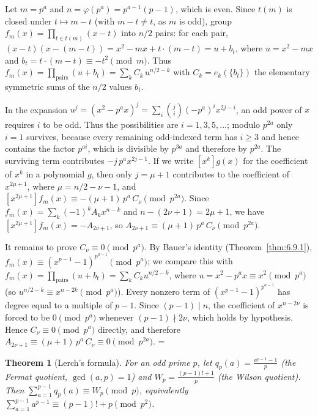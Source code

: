 \documentclass[11pt]{article}
\makeatletter
\let\nt@closedisplay\]
\def\nt@guardedclose{\@ifnextchar\par{\nt@closeafterpar}{\@ifnextchar\end{\postdisplaypenalty\@M\nt@closedisplay}{\nt@closedisplay}}}
\def\nt@closeafterpar\par{\@ifnextchar\par{\nt@closeafterpar}{\@ifnextchar\end{\postdisplaypenalty\@M\nt@closedisplay\par}{\nt@closedisplay\par}}}
\renewenvironment{proof}[1][\proofname]{\par
  \pushQED{\qed}\normalfont\topsep\medskipamount\edef\nt@afterproof{\@endparpenalty=\the\@endparpenalty\relax}\@beginparpenalty\@M\@endparpenalty\@M\let\]\nt@guardedclose\trivlist\item[]\textit{#1\@addpunct{.}} \ignorespaces}{\ifvmode\addpenalty\@M\fi\popQED\nt@afterproof\endtrivlist\@endpefalse}
\theoremstyle{ntstyle}
\newtheorem{theorem}{Theorem}[subsection]
\makeatother
\begin{document}
\begin{proof}
  Let $m = p^{a}$ and $n = \varphi(p^{a}) = p^{a-1}(p-1)$, which is even. Since $t(m)$ is closed under
  $t \mapsto m - t$ (with $m - t \neq t$, as $m$ is odd), group $f_m(x) = \prod_{t \in t(m)}(x-t)$ into $n/2$
  pairs: for each pair, $(x-t)(x-(m-t)) = x^{2} - m x + t\cdot(m-t) = u + b_t$, where $u = x^{2} - m x$ and
  $b_t = t\cdot(m-t) \equiv -t^{2} \pmod{m}$. Thus
  $f_m(x) = \prod_{\text{pairs}}(u + b_t) = \sum_{k} C_k\, u^{n/2 - k}$ with $C_k = e_k(\{b_t\})$ the
  elementary symmetric sums of the $n/2$ values $b_t$.

  In the expansion $u^{j} = (x^{2} - p^{a} x)^{j} = \sum_{i} \binom{j}{i}(-p^{a})^{i} x^{2j - i}$, an odd power of
  $x$ requires $i$ to be odd. Thus the possibilities are $i=1,3,5,\ldots$; modulo $p^{2a}$ only $i=1$ survives,
  because every remaining odd-indexed term has $i\ge3$ and hence contains the factor $p^{ai}$, which is divisible
  by $p^{3a}$ and therefore by $p^{2a}$. The surviving term contributes $-j\,p^{a} x^{2j-1}$. If we write
  $[x^{k}] g(x)$ for the coefficient of $x^{k}$ in a polynomial $g$, then only
  $j = \mu+1$ contributes to the coefficient of $x^{2\mu+1}$, where $\mu = n/2 - \nu - 1$, and
  $[x^{2\mu+1}] f_m(x) \equiv -(\mu+1)\,p^{a}\, C_{\nu} \pmod{p^{2a}}$. Since
  $f_m(x) = \sum_k (-1)^{k} A_k x^{n-k}$ and $n - (2\nu+1) = 2\mu+1$, we have $[x^{2\mu+1}] f_m(x) = -A_{2\nu+1}$,
  so
  $A_{2\nu+1} \equiv (\mu+1)\,p^{a}\, C_{\nu} \pmod{p^{2a}}$.

  It remains to prove $C_{\nu} \equiv 0 \pmod{p^{a}}$. By Bauer's identity
  (Theorem~\ref{thm:6.9.1}), $f_m(x) \equiv (x^{p-1}-1)^{p^{a-1}} \pmod{p^{a}}$;
  we compare this with $f_m(x) = \prod_{\text{pairs}}(u+b_t) = \sum_k C_k u^{n/2-k}$, where
  $u = x^2 - p^a x \equiv x^2 \pmod{p^a}$ (so
  $u^{n/2-k} \equiv x^{n-2k} \pmod{p^a}$). Every nonzero term of
  $(x^{p-1}-1)^{p^{a-1}}$ has degree equal to a multiple of $p-1$. Since
  $(p-1)\mid n$, the coefficient of $x^{n-2\nu}$ is forced to be $0 \pmod{p^a}$ whenever $(p-1) \nmid 2\nu$, which
  holds by hypothesis.
  Hence $C_{\nu} \equiv 0 \pmod{p^{a}}$ directly, and therefore
  $A_{2\nu+1} \equiv (\mu+1)\,p^{a}\,C_{\nu} \equiv 0 \pmod{p^{2a}}$.
\end{proof}

\begin{theorem}[Lerch's formula]\label{thm:6.9.3}\label{thm:lerch-formula}
  For an odd prime
  $p$, let $q_p(a) = \tfrac{a^{p-1}-1}{p}$ (the Fermat quotient,
  $\gcd(a, p)=1$) and $W_p = \tfrac{(p-1)!+1}{p}$ (the Wilson quotient).
  Then $\sum_{a=1}^{p-1} q_p(a) \equiv W_p \pmod{p}$, equivalently
  $\sum_{a=1}^{p-1} a^{p-1} \equiv (p-1)! + p \pmod{p^{2}}$.

\end{theorem}
\end{document}
